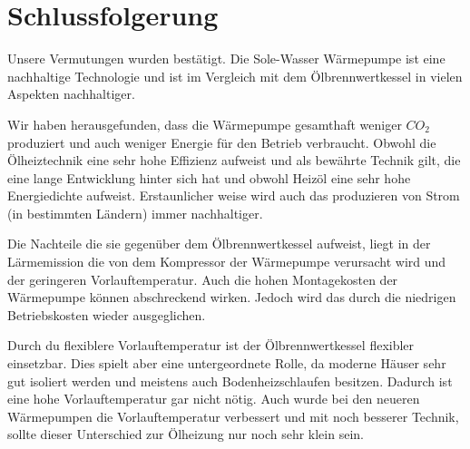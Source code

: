 \chapter{Schlussfolgerung}
\label{chap:fazit}

Unsere Vermutungen wurden bestätigt.
Die Sole-Wasser Wärmepumpe ist eine nachhaltige Technologie und ist im Vergleich
mit dem Ölbrennwertkessel in vielen Aspekten nachhaltiger.

Wir haben herausgefunden, dass die Wärmepumpe gesamthaft weniger $CO_2$
produziert und auch weniger Energie für den Betrieb verbraucht. 
Obwohl die Ölheiztechnik eine sehr hohe Effizienz aufweist und
als bewährte Technik gilt, die eine lange Entwicklung hinter sich hat und
obwohl Heizöl eine sehr hohe Energiedichte aufweist.
Erstaunlicher weise wird auch das produzieren von Strom (in bestimmten Ländern)
immer nachhaltiger.

Die Nachteile die sie gegenüber dem Ölbrennwertkessel aufweist, liegt
in der Lärmemission die von dem Kompressor der Wärmepumpe verursacht wird
und der geringeren Vorlauftemperatur. Auch die hohen Montagekosten der Wärmepumpe können abschreckend wirken. Jedoch wird das durch die niedrigen Betriebskosten wieder ausgeglichen.

Durch du flexiblere Vorlauftemperatur ist der Ölbrennwertkessel flexibler einsetzbar.
Dies spielt aber eine untergeordnete Rolle, da moderne Häuser sehr gut isoliert werden und meistens auch Bodenheizschlaufen besitzen. Dadurch ist eine hohe Vorlauftemperatur gar nicht nötig. Auch wurde bei den neueren Wärmepumpen die Vorlauftemperatur verbessert und mit noch besserer Technik, sollte dieser Unterschied zur Ölheizung nur noch sehr klein sein.
